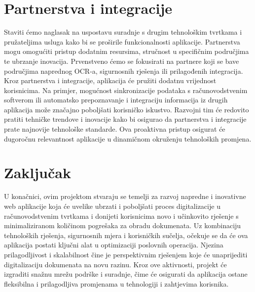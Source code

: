 		\section{Partnerstva i integracije}

		Staviti ćemo naglasak na uspostavu suradnje s drugim tehnološkim tvrtkama i pružateljima usluga kako bi se proširile funkcionalnosti aplikacije. Partnerstva mogu omogućiti pristup dodatnim resursima, stručnost u specifičnim područjima te ubrzanje inovacija.
		Prvenstveno ćemo se fokusirati na partnere koji se bave područjima naprednog OCR-a, sigurnosnih rješenja ili prilagođenih integracija. Kroz partnerstva i integracije, aplikacija će pružiti dodatnu vrijednost korisnicima. Na primjer, mogućnost sinkronizacije podataka s računovodstvenim softverom ili automatsko prepoznavanje i integraciju informacija iz drugih aplikacija može značajno poboljšati korisničko iskustvo.				 Razvojni tim će redovito pratiti tehničke trendove i inovacije kako bi osigurao da partnerstva i integracije prate najnovije tehnološke standarde. Ova proaktivna pristup osigurat će dugoročnu relevantnost aplikacije u dinamičnom okruženju tehnoloških promjena.
		
		\section{Zaključak}
		
		U konačnici, ovim projektom  stvaraju se temelji za razvoj napredne i inovativne web aplikacije koja će uvelike ubrzati i
		poboljšati proces digitalizacije u računovodstvenim tvrtkama i donijeti korisnicima novo i učinkovito rješenje s
		minimaliziranom količinom pogrešaka za obradu dokumenata. Uz kombinaciju tehnoloških rješenja, sigurnosnih mjera i korisničkih sučelja, očekuje se da će ova aplikacija postati ključni alat u optimizaciji poslovnih operacija. 
		Njezina prilagodljivost i skalabilnost čine je perspektivnim rješenjem koje će unaprijediti digitalizaciju dokumenata na novu razinu.
		Kroz ove aktivnosti, projekt će izgraditi snažnu mrežu podrške i suradnje, čime će osigurati da aplikacija ostane fleksibilna i prilagodljiva promjenama u tehnologiji i zahtjevima korisnika.
		\eject
			
	